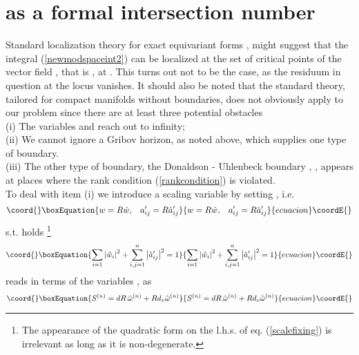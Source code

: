 \documentclass[a4paper,12pt]{article}
\begin{document}
\section{\coordHE{} as a formal intersection number}\label{sec:IV}

Standard localization theory for exact equivariant forms 
\cite{berline}, \cite{schwarz} might suggest that the integral 
(\ref{newmodspaceint2}) can be localized at the set of critical 
points of the vector field \coordHE{}, that is , at \coordHE{}. 
This turns out not to be the case, as the residuum in question at 
the locus \coordHE{} vanishes. It should also be noted that the standard 
theory, tailored for compact manifolds without boundaries, does 
not obviously apply to our problem since there are at least three 
potential obstacles \\
(i) The variables \coordHE{} and \coordHE{} reach out to infinity; \\
(ii) We cannot ignore a Gribov horizon, as noted above, which 
supplies one type of boundary. \\
(iii) The other type of boundary, the Donaldson - Uhlenbeck boundary 
\cite{donaldson}, \cite{uhlenbeck}, appears at places where the 
rank condition (\ref{rankcondition}) is violated. \\
To deal with item (i) we introduce a scaling variable by setting 
\coordHE{}, i.e.  
\begin{equation}\coord{}\boxEquation{
w=R\hat{w}, \, \, \, \, \, a'_{ij}=R\hat{a}'_{ij}
}{
w=R\hat{w}, \, \, \, \, \, a'_{ij}=R\hat{a}'_{ij}
}{ecuacion}\coordE{}\end{equation}
s.t. holds \footnote{The appearance of the quadratic form on 
the l.h.s. of eq. (\ref{scalefixing}) is irrelevant as long as 
it is non-degenerate.}
\begin{equation}\coord{}\boxEquation{
\sum_{i=1} \left| \hat{w}_i \right|^2 +\sum_{i,j=1}^n 
\left| \hat{a}'_{ij} \right|^2 = 1
\label{scalefixing} 
}{
\sum_{i=1} \left| \hat{w}_i \right|^2 +\sum_{i,j=1}^n 
\left| \hat{a}'_{ij} \right|^2 = 1
}{ecuacion}\coordE{}\end{equation}       
\coordHE{} reads in terms of the variables \coordHE{}, \coordHE{} as 
\begin{equation}\coord{}\boxEquation{
S^{(n)}=dR \, \hat{\omega}^{(n)}+Rd_v \hat{\omega}^{(n)}
}{
S^{(n)}=dR \, \hat{\omega}^{(n)}+Rd_v \hat{\omega}^{(n)}
}{ecuacion}\coordE{}\end{equation}
\end{document}
